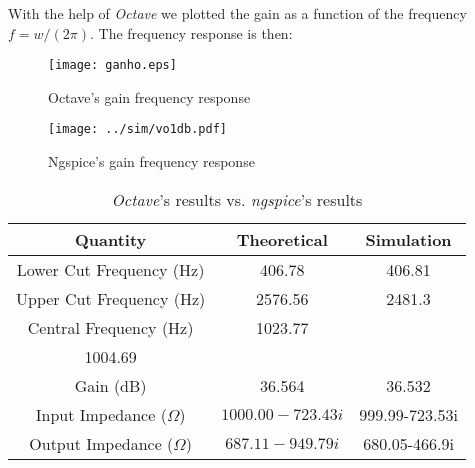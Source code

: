 With the help of \textit{Octave} we plotted the gain as a function of the frequency $f=w/(2\pi)$. The frequency response is then:

\begin{figure}[H]
 \centering
   \texttt{[image: ganho.eps]}
   \caption{Octave's gain frequency response}
   \label{fig:Octavegain(f)}
\end{figure}

\begin{figure}[H]
 \centering
   \texttt{[image: ../sim/vo1db.pdf]}
   \caption{Ngspice's gain frequency response}
   \label{fig:Ngspicegain(f)}
\end{figure}

\begin{center}
    \begin{table}[H]
        \centering
        \begin{tabular}{c|c|c}
          \textbf{Quantity} & \textbf{Theoretical}  & \textbf{Simulation}  \\
          \hline

            Lower Cut Frequency (Hz) &  406.78 &  406.81 \\
            Upper Cut Frequency (Hz)&  2576.56 &  2481.3 \\
            Central Frequency (Hz)& 1023.77 & \\ 1004.69 \\
            Gain (dB) &  36.564  & 36.532 \\
            Input Impedance ($\Omega$) & $1000.00-723.43i$ & 999.99-723.53i\\
            Output Impedance ($\Omega$) & $687.11-949.79i$ & 680.05-466.9i\\
        \end{tabular}
        \caption{\textit{Octave}'s results vs. \textit{ngspice}'s results}
    \end{table}
\end{center}
